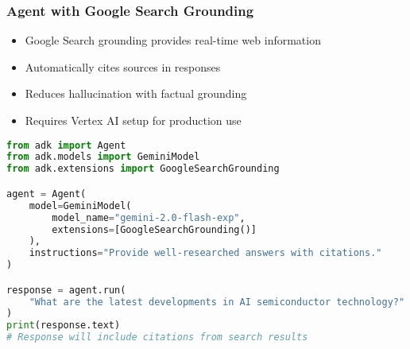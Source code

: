 \begin{frame}[fragile]\frametitle{Agent with Google Search Grounding}
      \begin{itemize}
	\item Google Search grounding provides real-time web information
	\item Automatically cites sources in responses
	\item Reduces hallucination with factual grounding
	\item Requires Vertex AI setup for production use
	  \end{itemize}
      
      \begin{lstlisting}[language=python, basicstyle=\tiny]
from adk import Agent
from adk.models import GeminiModel
from adk.extensions import GoogleSearchGrounding

agent = Agent(
    model=GeminiModel(
        model_name="gemini-2.0-flash-exp",
        extensions=[GoogleSearchGrounding()]
    ),
    instructions="Provide well-researched answers with citations."
)

response = agent.run(
    "What are the latest developments in AI semiconductor technology?"
)
print(response.text)
# Response will include citations from search results
      \end{lstlisting}
\end{frame}

